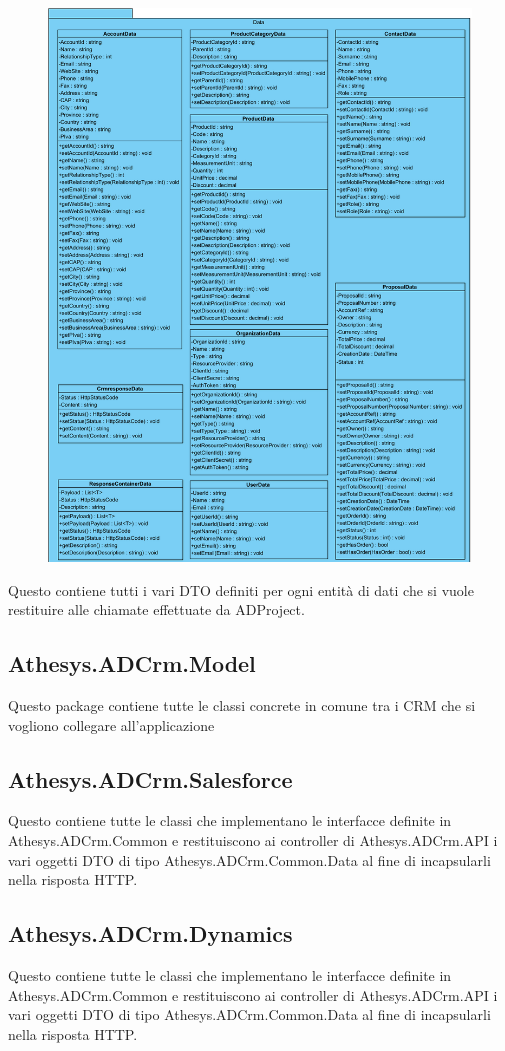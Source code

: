 \begin{figure}[H]
	\centering
	\includegraphics[width=\linewidth]{images/modules/Data}
	\caption{}
	\label{fig:data}
\end{figure}


Questo  contiene tutti i vari DTO definiti per ogni entità di dati che si vuole restituire alle chiamate effettuate da ADProject. 

\subsection{Athesys.ADCrm.Model}
Questo package contiene tutte le classi concrete in comune tra i CRM che si vogliono collegare all'applicazione 

\subsection{Athesys.ADCrm.Salesforce}
Questo  contiene tutte le classi che implementano le interfacce definite in Athesys.ADCrm.Common e restituiscono ai controller di Athesys.ADCrm.API i vari oggetti DTO di tipo Athesys.ADCrm.Common.Data al fine di incapsularli nella risposta HTTP.

\subsection{Athesys.ADCrm.Dynamics}
Questo  contiene tutte le classi che implementano le interfacce definite in Athesys.ADCrm.Common e restituiscono ai controller di Athesys.ADCrm.API i vari oggetti DTO di tipo Athesys.ADCrm.Common.Data al fine di incapsularli nella risposta HTTP.